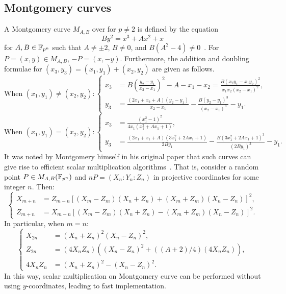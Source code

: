 %
%

\subsection{Montgomery curves}
\label{sec:montgomery-symmetry}
%
A Montgomery curve $M_{A,B}$ over  for $p\neq 2$ is defined by
the equation \begin{equation}
  By^2=x^3+Ax^2+x \label{eq:montgomery-curve} \end{equation} for
$A,B\in\mathbb F_{p^n}$ such that $A\neq\pm 2$, $B\neq 0$, and
$B(A^2-4)\neq 0$~\cite{1987-montgomery}.
%
For $P=(x,y)\in M_{A,B}$, $-P=(x,-y)$.
%
Furthermore, the addition and doubling formulae for
$(x_3,y_3)=(x_1,y_1)+(x_2,y_2)$ are given as follows.
%
\[ \text{When }(x_1,y_1)\neq(x_2,y_2):\left\{\begin{aligned}
      x_3 & = B\left(\frac{y_2 - y_1} {x_2 - x_1}\right)^2 - A - x_1 - x_2 = \frac{B(x_2y_1 - x_1y_2)^2} {x_1x_2(x_2 - x_1)^2}, \\
      y_3 & = \frac{(2x_1 + x_2 + A)(y_2 - y_1)} {x_2 - x_1} -
      \frac{B(y_2 - y_1)^3} {(x_2 - x_1)^3} - y_1.
    \end{aligned}\right. \] \[ \text{When }(x_1,y_1)=(x_2,y_2):\left\{\begin{aligned}
      x_3 & = \frac{(x_1^2 - 1)^2} {4x_1(x_1^2 + Ax_1 + 1)},  \\
      y_3 & = \frac{(2x_1 + x_1 + A)(3x_1^2 + 2Ax_1 + 1)} {2By_1} -
      \frac{B(3x_1^2 + 2Ax_1 + 1)^3} {(2By_1)^3} - y_1.
  \end{aligned}\right. \]
%
It was noted by Montgomery himself in his original paper that such
curves can give rise to efficient scalar multiplication
algorithms~\cite{1987-montgomery}.
%
That is, consider a random point $P\in M_{A,B}(\mathbb F_{p^n})$ and
$nP=(X_n:Y_n:Z_n)$ in projective coordinates for some integer $n$.
%
Then:
%
\[ \left\{\begin{aligned}
      X_{m+n} & = Z_{m-n}[(X_m - Z_m)(X_n + Z_n) + (X_m + Z_m)(X_n - Z_n)]^2, \\
      Z_{m+n} & = X_{m-n}[(X_m - Z_m)(X_n + Z_n) - (X_m + Z_m)(X_n -
      Z_n)]^2.
    \end{aligned}\right. \]
%
In particular, when $m=n$:
\[ \left\{\begin{aligned}
      X_{2n} & = (X_n + Z_n)^2(X_n - Z_n)^2, \\
      Z_{2n} & = (4X_nZ_n)\left((X_n - Z_n)^2 + ((A+2)/4)(4X_nZ_n)\right), \\
      4X_nZ_n & = ( X_n + Z_n)^2 - (X_n - Z_n)^2.
    \end{aligned}\right. \]
%
In this way, scalar multiplication on Montgomery curve can be
performed without using $y$-coordinates, leading to fast
implementation.


